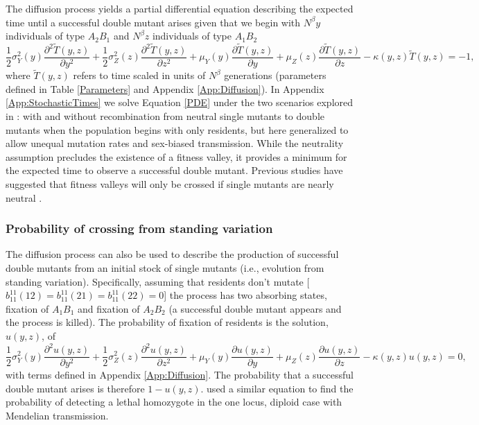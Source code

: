 \documentclass[review,3p,authoryear]{elsarticle}
\begin{document}
The diffusion process yields a partial differential equation describing the expected time until a successful double mutant arises given that we begin with $N^\beta y$ individuals of type $A_2B_1$ and $N^\beta z$ individuals of type $A_1B_2$ \citep{Christiansen1998}
\begin{equation}\label{PDE}
\frac{1}{2}\sigma_Y^2(y) \frac{\partial^2 \tilde{T}(y,z)}{\partial y^2} + \frac{1}{2}\sigma_Z^2(z) \frac{\partial^2 \tilde{T}(y,z)}{\partial z^2} + \mu_Y(y) \frac{\partial \tilde{T}(y,z)}{\partial y} + \mu_Z(z) \frac{\partial \tilde{T}(y,z)}{\partial z} - \kappa(y,z) \tilde{T}(y,z) = -1,
\end{equation}
where $\tilde{T}(y,z)$ refers to time scaled in units of $N^\beta$ generations (parameters defined in Table \ref{Parameters} and Appendix \ref{App:Diffusion}).
In Appendix \ref{App:StochasticTimes} we solve Equation \eqref{PDE} under the two scenarios explored in \cite{Christiansen1998}: with and without recombination from neutral single mutants to double mutants when the population begins with only residents, but here generalized to allow unequal mutation rates and sex-biased transmission.
While the neutrality assumption precludes the existence of a fitness valley, it provides a minimum for the expected time to observe a successful double mutant.
Previous studies have suggested that fitness valleys will only be crossed if single mutants are nearly neutral \citep[e.g.,][]{Walsh1982}. 

\subsubsection{Probability of crossing from standing variation}

The diffusion process can also be used to describe the production of successful double mutants from an initial stock of single mutants (i.e., evolution from standing variation).
Specifically, assuming that residents don't mutate [$b_{11}^{11}(12) = b_{11}^{11}(21) = b_{11}^{11}(22) = 0$] the process has two absorbing states, fixation of $A_1B_1$ and fixation of $A_2B_2$ (a successful double mutant appears and the process is killed).
The probability of fixation of residents is the solution, $u(y,z)$, of \citep{Karlin1981book}
\begin{equation}\label{uPDE}
\frac{1}{2}\sigma_Y^2(y) \frac{\partial^2 u(y,z)}{\partial y^2} + \frac{1}{2}\sigma_Z^2(z) \frac{\partial^2 u(y,z)}{\partial z^2} + \mu_Y(y) \frac{\partial u(y,z)}{\partial y} + \mu_Z(z) \frac{\partial u(y,z)}{\partial z} - \kappa(y,z) u(y,z) = 0,
\end{equation}
with terms defined in Appendix \ref{App:Diffusion}.
The probability that a successful double mutant arises is therefore $1-u(y,z)$.
\cite{Karlin1981b} used a similar equation to find the probability of detecting a lethal homozygote in the one locus, diploid case with Mendelian transmission.
\end{document}
